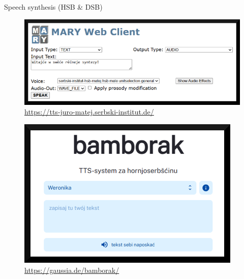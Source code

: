   \begin{block}{Speech synthesis (HSB \& DSB)}


    \begin{figure}
        \centering
        \includegraphics[width=0.7\colwidth]{06_z_01_marytts_small_rand.png}
        \caption{\url{https://tts-juro-matej.serbski-institut.de/}}
        \label{fig:marytts}
    \end{figure}



    \begin{figure}
        \centering
        \includegraphics[width=0.5\colwidth]{06_z_02_bamborak_small_rand.png}
        \caption{\url{https://gaussia.de/bamborak/}}
        \label{fig:bamborak}
    \end{figure}
    

  \end{block}
